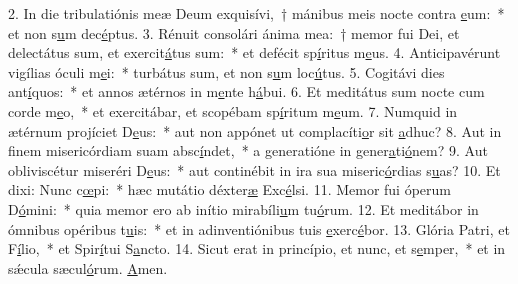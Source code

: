 2. In die tribulatiónis meæ Deum exquisívi,~† mánibus meis nocte contra \uline{e}um:~* et non s\uline{u}m dec\uline{é}ptus.
3. Rénuit consolári ánima mea:~† memor fui Dei, et delectátus sum, et exercit\uline{á}tus sum:~* et defécit sp\uline{í}ritus m\uline{e}us.
4. Anticipavérunt vigílias óculi m\uline{e}i:~* turbátus sum, et non s\uline{u}m loc\uline{ú}tus.
5. Cogitávi dies ant\uline{í}quos:~* et annos ætérnos in m\uline{e}nte h\uline{á}bui.
6. Et meditátus sum nocte cum corde m\uline{e}o,~* et exercitábar, et scopébam sp\uline{í}ritum m\uline{e}um.
7. Numquid in ætérnum projíciet D\uline{e}us:~* aut non appónet ut complacíti\uline{o}r sit \uline{a}dhuc?
8. Aut in finem misericórdiam suam absc\uline{í}ndet,~* a generatióne in gener\uline{a}ti\uline{ó}nem?
9. Aut obliviscétur miseréri D\uline{e}us:~* aut continébit in ira sua miseric\uline{ó}rdias s\uline{u}as?
10. Et dixi: Nunc c\uline{œ}pi:~* hæc mutátio déxter\uline{æ} Exc\uline{é}lsi.
11. Memor fui óperum D\uline{ó}mini:~* quia memor ero ab inítio mirabíli\uline{u}m tu\uline{ó}rum.
12. Et meditábor in ómnibus opéribus t\uline{u}is:~* et in adinventiónibus tuis \uline{e}xerc\uline{é}bor.
13. Glória Patri, et F\uline{í}lio,~* et Spir\uline{í}tui S\uline{a}ncto.
14. Sicut erat in princípio, et nunc, et s\uline{e}mper,~* et in sǽcula sæcul\uline{ó}rum. \uline{A}men.
